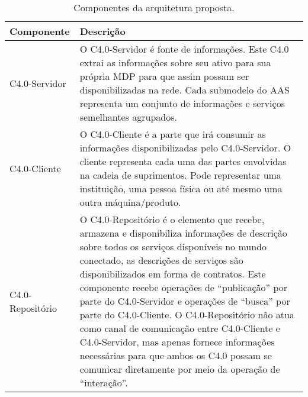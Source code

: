 \begin{table}[htb]
	\centering
	\caption{Componentes da arquitetura proposta.}
	\label{tab:componentes-ws}
	\begin{tabular}{p{3cm}p{12cm}}
		\hline
		\textbf{Componente}
		 & \textbf{Descrição}                                                                                                                                                                                                                                                                                                                                                                                                                                                                                                                                                                               \\

		\hline
		C4.0-Servidor
		 & O C4.0-Servidor é fonte de informações. Este C4.0 extrai as informações sobre seu ativo para sua própria MDP para que assim possam ser disponibilizadas na rede. Cada submodelo do AAS representa um conjunto de informações e serviços semelhantes agrupados.                                                                                                                                                                                                                                                                                                                                   \\

		\hline
		C4.0-Cliente
		 & O C4.0-Cliente é a parte que irá consumir as informações disponibilizadas pelo C4.0-Servidor. O cliente representa cada uma das partes envolvidas na cadeia de suprimentos. Pode representar uma instituição, uma pessoa física ou até mesmo uma outra máquina/produto.                                                                                                                                                                                                                                                                                                                          \\

		\hline
		C4.0-Repositório
		 & O C4.0-Repositório é o elemento que recebe, armazena e disponibiliza informações de descrição sobre todos os serviços disponíveis no mundo conectado, as descrições de serviços são disponibilizados em forma de contratos. Este componente recebe operações de ``publicação'' por parte do C4.0-Servidor e operações de ``busca'' por parte do C4.0-Cliente. O C4.0-Repositório não atua como canal de comunicação entre C4.0-Cliente e C4.0-Servidor, mas apenas fornece informações necessárias para que ambos os C4.0 possam se comunicar diretamente por meio da operação de ``interação''. \\

		\hline
	\end{tabular}
\end{table}


